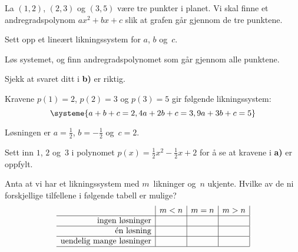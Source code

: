 \begin{oppgave}
La $(1,2)$, $(2,3)$ og $(3,5)$ være tre punkter i planet. Vi skal
finne et andregradspolynom $ax^2 + bx + c$ slik at grafen går gjennom
de tre punktene.
\begin{center}
\vspace{-5pt}
\end{center}
\begin{punkt}
Sett opp et lineært likningssystem for $a$, $b$ og~$c$.
\end{punkt}
\begin{punkt}
Løs systemet, og finn andregradspolynomet som går gjennom alle punktene.
\end{punkt}
\begin{punkt}
Sjekk at svaret ditt i \textbf{b)} er riktig.
\end{punkt}
\end{oppgave}

\begin{losning}
	\begin{punkt}
		Kravene $p(1)=2$, $p(2)=3$ og $p(3)=5$ gir følgende likningssystem:
		$$
		\systeme{
			a+b+c = 2,
			4a+2b+c = 3,
			9a+3b+c = 5
		}
		$$
		
	\end{punkt}
	\begin{punkt}
		Løsningen er $a=\frac{1}{2}$, $b=-\frac{1}{2}$ og~$c=2$.
	\end{punkt}
	
	\begin{punkt}
		Sett inn $1$, $2$ og~$3$ i polynomet $p(x)=\frac{1}{2}x^2-\frac{1}{2}x+2$ for å se at kravene i \textbf{a)} er oppfylt.  
	\end{punkt}
\end{losning}


\begin{oppgave}
Anta at vi har et likningssystem med $m$~likninger og~$n$ ukjente.
Hvilke av de ni forskjellige tilfellene i følgende tabell er mulige?
\[
\begin{array}{r|c|c|c|}
                                & m < n & m = n & m > n \\ \hline
\text{ingen løsninger}          &       &       &       \\ \hline
\text{én løsning}               &       &       &       \\ \hline
\text{uendelig mange løsninger} &       &       &       \\ \hline
\end{array}
\]
\end{oppgave}

